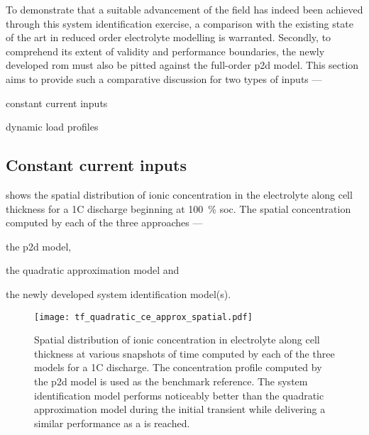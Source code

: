 
To demonstrate that a suitable advancement of the field has indeed been achieved
through  this system  identification exercise,  a comparison  with the  existing
state of the art in reduced  order electrolyte modelling is warranted. Secondly,
to  comprehend its  extent of  validity  and performance  boundaries, the  newly
developed \gls{rom} must also be  pitted against the full-order \gls{p2d} model.
This section  aims to  provide such  a comparative discussion  for two  types of
inputs ---
\begin{enumerate*}[label=\itshape\alph*\upshape)]
    \item constant current inputs
    \item dynamic load profiles
\end{enumerate*}

\subsection{Constant current inputs}

 shows  the spatial distribution  of ionic
concentration  in  the electrolyte  along  cell  thickness  for a  1C  discharge
beginning at \SI{100}{\percent} \gls{soc}. The spatial concentration computed by
each of the three approaches ---
\begin{enumerate*}[label=\roman*)]
    \item the \gls{p2d} model,
    \item the quadratic approximation model and
    \item the newly developed system identification model(s).
\end{enumerate*}

\begin{figure}[!htbp]
    \centering
    \texttt{[image: tf\_quadratic\_ce\_approx\_spatial.pdf]}
    \caption[Spatial distribution of ionic concentration in
    electrolyte for a 1C discharge computed by the , quadratic
    approximation \& system identification models]{%
        Spatial distribution of ionic concentration  in electrolyte along cell
        thickness at various  snapshots of  time computed  by each of  the three
        models for  a 1C discharge.  The concentration  profile  computed by
        the  \gls{p2d} model is used as the benchmark reference. The  system
        identification model performs noticeably better than the quadratic
        approximation model during  the initial  transient  while delivering a
        similar performance as a  is reached.
}%
\label{fig:tfquadp2dspatialionicconc1C}
\end{figure}

